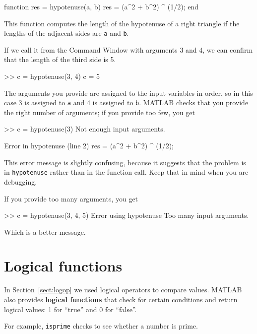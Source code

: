 \documentclass[
]{book}
\numberwithin{Answer}{chapter}
\numberwithin{Exercise}{chapter}
\begin{document}
\begin{code}
function res = hypotenuse(a, b)
    res = (a^2 + b^2) ^ (1/2);
end
\end{code}
  
This function computes the length of the hypotenuse of a right
triangle if the lengths of the adjacent sides are {\tt a}
and {\tt b}.

If we call it from the {\sf Command Window} with arguments 3 and 4, we can
confirm that the length of the third side is 5.

\begin{code}
>> c = hypotenuse(3, 4)
c = 5
\end{code}

The arguments you provide are assigned to the input variables in
order, so in this case 3 is assigned to {\tt a} and 4 is assigned to
{\tt b}.  MATLAB checks that you provide the right number of arguments;
if you provide too few, you get

\begin{code}
>> c = hypotenuse(3)
Not enough input arguments.

Error in hypotenuse (line 2)
    res = (a^2 + b^2) ^ (1/2);
\end{code}

This error message is slightly confusing, because it suggests that
the problem is in {\tt hypotenuse} rather than in the function call.
Keep that in mind when you are debugging.

If you provide too many arguments, you get

\begin{code}
>> c = hypotenuse(3, 4, 5)
Error using hypotenuse
Too many input arguments.
\end{code}

Which is a better message.


\section{Logical functions}

In Section~\ref{sect:logop} we used logical operators to compare values.
MATLAB also provides {\bf logical functions} that check for certain
conditions and return logical values: 1 for ``true'' and 0 for ``false''.


For example, {\tt isprime} checks to see whether a number is prime.
\end{document}
